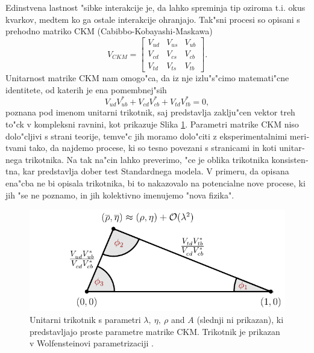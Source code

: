 \begin{otherlanguage}{slovene}
Edinstvena lastnost "sibke interakcije je, da lahko spreminja tip oziroma t.i. okus kvarkov, medtem ko ga ostale interakcije ohranjajo. Tak"sni procesi so opisani s prehodno matriko CKM (Cabibbo-Kobayashi-Maskawa) \cite{cabibbo1963unitary,kobayashi1973cp}
\begin{equation}
V_{CKM} = \begin{bmatrix}
    V_{ud} & V_{us} & V_{ub}\\
	V_{cd} & V_{cs} & V_{cb}\\
	V_{td} & V_{ts} & V_{tb}
\end{bmatrix}.
\end{equation}
Unitarnost matrike CKM nam omogo"ca, da iz nje izlu"s"cimo matemati"cne identitete, od katerih je ena pomembnej"sih
\begin{equation}
V_{ud}V_{ub}^* + V_{cd}V_{cb}^* + V_{td}V_{tb}^* = 0,
\end{equation}
poznana pod imenom unitarni trikotnik, saj predstavlja zaklju"cen vektor treh to"ck v kompleksni ravnini, kot prikazuje Slika \ref{fig:ut_si}. Parametri matrike CKM niso dolo"cljivi s strani teorije, temve"c jih moramo dolo"citi z eksperimentalnimi meritvami tako, da najdemo procese, ki so tesno povezani s stranicami in koti unitarnega trikotnika. Na tak na"cin lahko preverimo, "ce je oblika trikotnika konsistentna, kar predstavlja dober test Standardnega modela. V primeru, da opisana ena"cba ne bi opisala trikotnika, bi to nakazovalo na potencialne nove procese, ki jih "se ne poznamo, in jih kolektivno imenujemo "nova fizika". 
\begin{figure}[H]
\centering
\includegraphics[scale=1]{texfig/UT_Triangle}
	\captionsetup{width=0.8\linewidth}
\caption{Unitarni trikotnik s parametri $\lambda,~\eta,~\rho$ and $A$ (slednji ni prikazan), ki predstavljajo proste parametre matrike CKM. Trikotnik je prikazan v Wolfensteinovi parametrizaciji \cite{PhysRevLett.51.1945}.}
\label{fig:ut_si}
\end{figure}


\end{otherlanguage}
